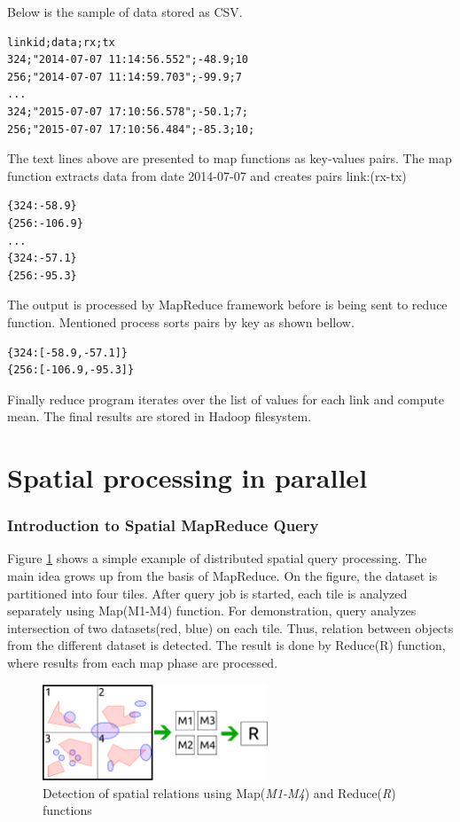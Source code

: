 \documentclass[a4paper,12pt,oneside]{report}
\begin{document}
Below is the sample of data stored as CSV.
\begin{footnotesize}
\begin{lstlisting}[style=mybash]
linkid;data;rx;tx
324;"2014-07-07 11:14:56.552";-48.9;10
256;"2014-07-07 11:14:59.703";-99.9;7
...
324;"2015-07-07 17:10:56.578";-50.1;7;
256;"2015-07-07 17:10:56.484";-85.3;10;
\end{lstlisting}
\end{footnotesize}
The text lines above are presented to map functions as key-values pairs.
The map function extracts data from date 2014-07-07 and creates pairs {link:(rx-tx)}
\begin{footnotesize}
\begin{lstlisting}[style=mybash]
{324:-58.9}
{256:-106.9}
...
{324:-57.1}
{256:-95.3}
\end{lstlisting}
\end{footnotesize}
The output is processed by MapReduce framework before is being sent to reduce function.
Mentioned process sorts pairs by key as shown bellow.
\begin{footnotesize}
\begin{lstlisting}[style=mybash]
{324:[-58.9,-57.1]}
{256:[-106.9,-95.3]}
\end{lstlisting}\end{footnotesize}
Finally reduce program iterates over the list of values for each link and compute mean.
 The final results are stored in Hadoop filesystem.
 


\section{Spatial processing in parallel}
	\subsubsection{Introduction to Spatial MapReduce Query}
Figure \ref{fig:mapred_spatial} shows a simple example of distributed spatial query processing. The main idea 
grows up from the basis of MapReduce. On the figure, the dataset is partitioned into four tiles. After 
query job is started, each tile is analyzed separately using Map(M1-M4) function. For demonstration, 
query analyzes intersection of two datasets(red, blue) on each tile. Thus, relation between 
objects from the different dataset is detected. The result is done by Reduce(R) function, where results from each
map phase are processed.

\begin{figure}[h!]
    \centering
    \includegraphics[width=0.6\textwidth]{./img/mapred_spatial.pdf}
    \caption[Spatial MapReduce]{\centering Detection of spatial relations using Map(\textit{M1-M4}) and Reduce(\textit{R}) functions}
        \label{fig:mapred_spatial}
 \end{figure}
\end{document}
